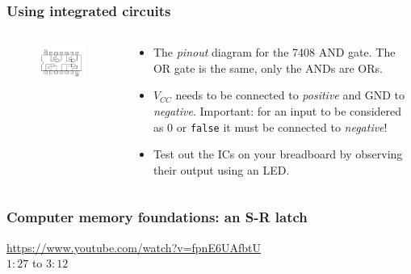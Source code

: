 \documentclass{beamer}
\begin{document}
\begin{frame}
  \frametitle{Using integrated circuits}

  \begin{columns}
    \begin{column}{0.4\textwidth}
      \begin{figure}
          \centering
          \includegraphics[width=\textwidth]{res/and-gate-ic.png}
      \end{figure}
    \end{column}
    \begin{column}{0.6\textwidth}
      \begin{itemize}
      \item
        The \emph{pinout} diagram for the 7408 AND gate. The OR gate is the
        same, only the ANDs are ORs.
      \item
        $V_{CC}$ needs to be connected to \emph{positive} and GND to
        \emph{negative}.  \alert{Important:} for an input to be considered as
        $0$ or \texttt{false} it must be connected to \emph{negative}!
      \item
        Test out the ICs on your breadboard by observing their output using an LED.
      \end{itemize}
    \end{column}
  \end{columns}
\end{frame}

\begin{frame}
  \frametitle{Computer memory foundations: an S-R latch}

  \url{https://www.youtube.com/watch?v=fpnE6UAfbtU} \\
  $1:27$ to $3:12$
\end{frame}
\end{document}
